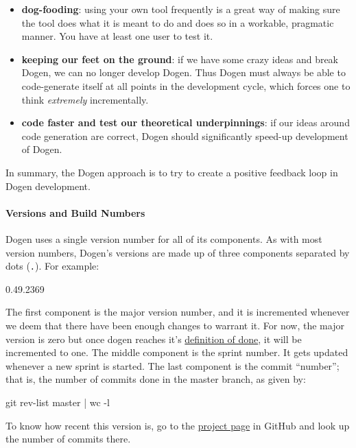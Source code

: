 \documentclass{book}
\begin{document}
\begin{itemize}
\item \textbf{dog-fooding}: using your own tool frequently is a great
  way of making sure the tool does what it is meant to do and does so
  in a workable, pragmatic manner. You have at least one user to test
  it.
\item \textbf{keeping our feet on the ground}: if we have some crazy
  ideas and break Dogen, we can no longer develop Dogen. Thus Dogen
  must always be able to code-generate itself at all points in the
  development cycle, which forces one to think \emph{extremely}
  incrementally.
\item \textbf{code faster and test our theoretical underpinnings}: if
  our ideas around code generation are correct, Dogen should
  significantly speed-up development of Dogen.
\end{itemize}

In summary, the Dogen approach is to try to create a positive feedback
loop in Dogen development.

\paragraph{Versions and Build Numbers}

Dogen uses a single version number for all of its components. As with
most version numbers, Dogen's versions are made up of three components
separated by dots (\texttt{.}). For example:

\begin{pseudocode}[backgroundcolor=\color{lightgray}]
0.49.2369
\end{pseudocode}

The first component is the major version number, and it is incremented
whenever we deem that there have been enough changes to warrant
it. For now, the major version is zero but once dogen reaches it's
\href{https://github.com/DomainDrivenConsulting/dogen/blob/master/doc/agile/definition_of_done.org}{definition
  of done}, it will be incremented to one. The middle component is the
sprint number. It gets updated whenever a new sprint is started. The
last component is the commit ``number''; that is, the number of commits
done in the master branch, as given by:

\begin{pseudocode}[backgroundcolor=\color{lightgray}]
git rev-list master | wc -l
\end{pseudocode}

To know how recent this version is, go to the
\href{https://github.com/DomainDrivenConsulting/dogen}{project page}
in GitHub and look up the number of commits there.
\end{document}

